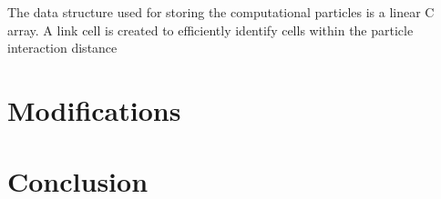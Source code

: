 \documentclass[12pt]{article}
\begin{document}
The data structure used for storing the computational particles is a linear C array.
A link cell is created to efficiently identify cells within the particle interaction distance 




\section{Modifications}




\section{Conclusion}



\end{document}
